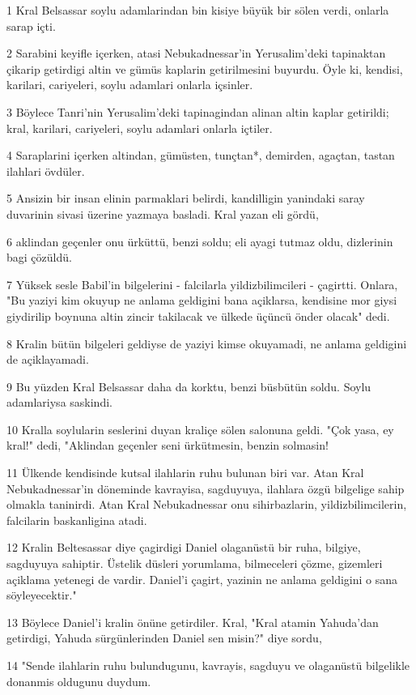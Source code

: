 \par 1 Kral Belsassar soylu adamlarindan bin kisiye büyük bir sölen verdi, onlarla sarap içti.
\par 2 Sarabini keyifle içerken, atasi Nebukadnessar'in Yerusalim'deki tapinaktan çikarip getirdigi altin ve gümüs kaplarin getirilmesini buyurdu. Öyle ki, kendisi, karilari, cariyeleri, soylu adamlari onlarla içsinler.
\par 3 Böylece Tanri'nin Yerusalim'deki tapinagindan alinan altin kaplar getirildi; kral, karilari, cariyeleri, soylu adamlari onlarla içtiler.
\par 4 Saraplarini içerken altindan, gümüsten, tunçtan*, demirden, agaçtan, tastan ilahlari övdüler.
\par 5 Ansizin bir insan elinin parmaklari belirdi, kandilligin yanindaki saray duvarinin sivasi üzerine yazmaya basladi. Kral yazan eli gördü,
\par 6 aklindan geçenler onu ürküttü, benzi soldu; eli ayagi tutmaz oldu, dizlerinin bagi çözüldü.
\par 7 Yüksek sesle Babil'in bilgelerini - falcilarla yildizbilimcileri - çagirtti. Onlara, "Bu yaziyi kim okuyup ne anlama geldigini bana açiklarsa, kendisine mor giysi giydirilip boynuna altin zincir takilacak ve ülkede üçüncü önder olacak" dedi.
\par 8 Kralin bütün bilgeleri geldiyse de yaziyi kimse okuyamadi, ne anlama geldigini de açiklayamadi.
\par 9 Bu yüzden Kral Belsassar daha da korktu, benzi büsbütün soldu. Soylu adamlariysa saskindi.
\par 10 Kralla soylularin seslerini duyan kraliçe sölen salonuna geldi. "Çok yasa, ey kral!" dedi, "Aklindan geçenler seni ürkütmesin, benzin solmasin!
\par 11 Ülkende kendisinde kutsal ilahlarin ruhu bulunan biri var. Atan Kral Nebukadnessar'in döneminde kavrayisa, sagduyuya, ilahlara özgü bilgelige sahip olmakla taninirdi. Atan Kral Nebukadnessar onu sihirbazlarin, yildizbilimcilerin, falcilarin baskanligina atadi.
\par 12 Kralin Beltesassar diye çagirdigi Daniel olaganüstü bir ruha, bilgiye, sagduyuya sahiptir. Üstelik düsleri yorumlama, bilmeceleri çözme, gizemleri açiklama yetenegi de vardir. Daniel'i çagirt, yazinin ne anlama geldigini o sana söyleyecektir."
\par 13 Böylece Daniel'i kralin önüne getirdiler. Kral, "Kral atamin Yahuda'dan getirdigi, Yahuda sürgünlerinden Daniel sen misin?" diye sordu,
\par 14 "Sende ilahlarin ruhu bulundugunu, kavrayis, sagduyu ve olaganüstü bilgelikle donanmis oldugunu duydum.
